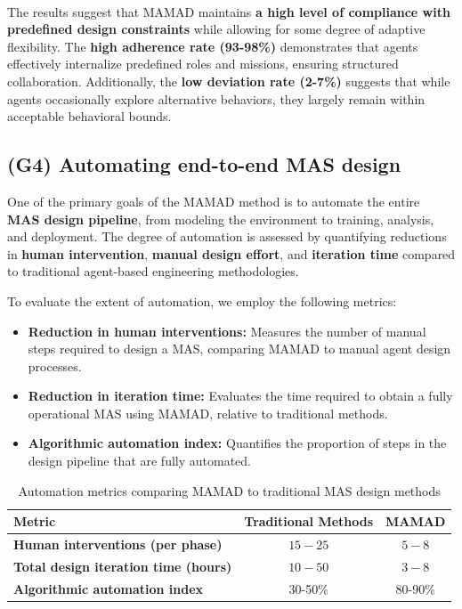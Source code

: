 \documentclass[pdflatex,sn-mathphys-num]{sn-jnl}%
\theoremstyle{thmstyleone}%
\theoremstyle{thmstyletwo}%
\theoremstyle{thmstylethree}%
\begin{document}
\

The results suggest that MAMAD maintains \textbf{a high level of compliance with predefined design constraints} while allowing for some degree of adaptive flexibility. The \textbf{high adherence rate (93-98\%)} demonstrates that agents effectively internalize predefined roles and missions, ensuring structured collaboration. Additionally, the \textbf{low deviation rate (2-7\%)} suggests that while agents occasionally explore alternative behaviors, they largely remain within acceptable behavioral bounds.

\subsection{(G4) Automating end-to-end MAS design}

One of the primary goals of the MAMAD method is to automate the entire \textbf{MAS design pipeline}, from modeling the environment to training, analysis, and deployment. The degree of automation is assessed by quantifying reductions in \textbf{human intervention}, \textbf{manual design effort}, and \textbf{iteration time} compared to traditional agent-based engineering methodologies.

To evaluate the extent of automation, we employ the following metrics:

\begin{itemize}
    \item \textbf{Reduction in human interventions:} Measures the number of manual steps required to design a MAS, comparing MAMAD to manual agent design processes.
    \item \textbf{Reduction in iteration time:} Evaluates the time required to obtain a fully operational MAS using MAMAD, relative to traditional methods.
    \item \textbf{Algorithmic automation index:} Quantifies the proportion of steps in the design pipeline that are fully automated.
\end{itemize}

\begin{table}[h!]
    \centering
    \caption{Automation metrics comparing MAMAD to traditional MAS design methods}
    \begin{tabular}{|l|c|c|}
        \hline
        \textbf{Metric} & \textbf{Traditional Methods} & \textbf{MAMAD} \\
        \hline
        \textbf{Human interventions (per phase)} & $15 - 25$ & $5 - 8$ \\
        \hline
        \textbf{Total design iteration time (hours)} & $10 - 50$ & $3 - 8$ \\
        \hline
        \textbf{Algorithmic automation index} & 30-50\% & 80-90\% \\
        \hline
    \end{tabular}
    \label{tab:automation}
\end{table}
\end{document}

